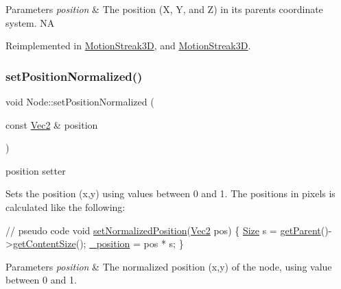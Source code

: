 \begin{DoxyParams}{Parameters}
{\em position} & The position (X, Y, and Z) in its parent\textquotesingle{}s coordinate system.  NA \\
\hline
\end{DoxyParams}


Reimplemented in \hyperlink{classMotionStreak3D_a34fac2c60502d074f8e40e99d01d9180}{Motion\+Streak3D}, and \hyperlink{classMotionStreak3D_a0a0d2f5f302ecaecb2e6652e5863f28f}{Motion\+Streak3D}.

\mbox{\label{classNode_a4014e9c3840ed79bf9e5b5193e1f1a4b}} 
\subsubsection{\texorpdfstring{set\+Position\+Normalized()}{setPositionNormalized()}}
{\footnotesize\ttfamily void Node\+::set\+Position\+Normalized (\begin{DoxyParamCaption}\item[{const \hyperlink{classVec2}{Vec2} \&}]{position }\end{DoxyParamCaption})\hspace{0.3cm}{\ttfamily [virtual]}}



position setter 

Sets the position (x,y) using values between 0 and 1. The positions in pixels is calculated like the following\+: 
\begin{DoxyCode}
\textcolor{comment}{// pseudo code}
\textcolor{keywordtype}{void} \hyperlink{classNode_a3665662090ae9ebd3820ee4e7199da7b}{setNormalizedPosition}(\hyperlink{classVec2}{Vec2} pos) \{
  \hyperlink{classSize}{Size} s = \hyperlink{classNode_af4c8a4ae726c6dd984db05c89454652d}{getParent}()->\hyperlink{classNode_a3828836a62dbf0862ecaa99a72babc13}{getContentSize}();
  \hyperlink{classNode_a3b3dff369c98537eeeab4c0bcbf3a69f}{\_position} = pos * s;
\}
\end{DoxyCode}



\begin{DoxyParams}{Parameters}
{\em position} & The normalized position (x,y) of the node, using value between 0 and 1. \\
\hline
\end{DoxyParams}
\mbox{\label{classNode_ae1dfc73d6122a95778d5d9db3d1fd913}} 
